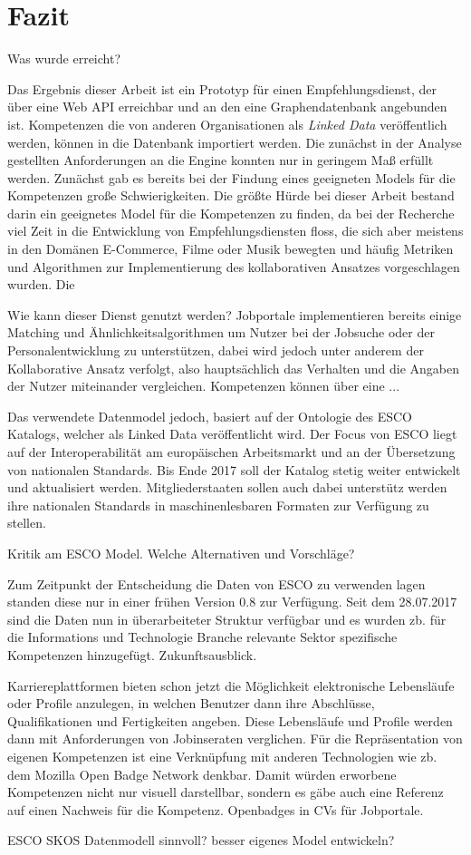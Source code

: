 \section{Fazit}\label{fazit}

Was wurde erreicht?

Das Ergebnis dieser Arbeit ist ein Prototyp für einen Empfehlungsdienst, der über eine Web API erreichbar und an den eine Graphendatenbank angebunden ist. Kompetenzen die von anderen Organisationen als \textit{Linked Data} veröffentlich werden, können in die Datenbank importiert werden. Die zunächst in der Analyse gestellten Anforderungen an die Engine konnten nur in geringem Maß erfüllt werden. Zunächst gab es bereits bei der Findung eines geeigneten Models für die Kompetenzen große Schwierigkeiten. Die größte Hürde bei dieser Arbeit bestand darin ein geeignetes Model für die Kompetenzen zu finden, da bei der Recherche viel Zeit in die Entwicklung von Empfehlungsdiensten floss, die sich aber meistens in den Domänen E-Commerce, Filme oder Musik bewegten und häufig Metriken und Algorithmen zur Implementierung des kollaborativen Ansatzes vorgeschlagen wurden. 
Die 

Wie kann dieser Dienst genutzt werden? 
Jobportale implementieren bereits einige Matching und Ähnlichkeitsalgorithmen um Nutzer bei der Jobsuche oder der Personalentwicklung zu unterstützen, dabei wird jedoch unter anderem der Kollaborative Ansatz verfolgt, also hauptsächlich das Verhalten und die Angaben der Nutzer miteinander vergleichen. Kompetenzen können über eine ...

Das verwendete Datenmodel jedoch, basiert auf der Ontologie des ESCO Katalogs, welcher als Linked Data veröffentlicht wird. Der Focus von ESCO liegt auf der Interoperabilität am europäischen Arbeitsmarkt und an der Übersetzung von nationalen Standards. Bis Ende 2017 soll der Katalog stetig weiter entwickelt und aktualisiert werden. Mitgliederstaaten sollen auch dabei unterstütz werden ihre nationalen Standards in maschinenlesbaren Formaten zur Verfügung zu stellen.

Kritik 
  am ESCO Model. Welche Alternativen und Vorschläge?
  
  Zum Zeitpunkt der Entscheidung die Daten von ESCO zu verwenden lagen standen diese nur in einer frühen Version 0.8 zur Verfügung. Seit dem 28.07.2017 sind die Daten nun in überarbeiteter Struktur verfügbar und es wurden zb. für die Informations und Technologie Branche relevante Sektor spezifische Kompetenzen hinzugefügt. 
Zukunftsausblick.

Karriereplattformen bieten schon jetzt die Möglichkeit elektronische Lebensläufe oder Profile anzulegen, in welchen Benutzer dann ihre Abschlüsse, Qualifikationen und Fertigkeiten angeben. Diese Lebensläufe und Profile werden dann mit Anforderungen von Jobinseraten verglichen. Für die Repräsentation von eigenen Kompetenzen ist eine Verknüpfung mit anderen Technologien wie zb. dem Mozilla Open Badge Network denkbar. Damit würden erworbene Kompetenzen nicht nur visuell darstellbar, sondern es gäbe auch eine Referenz auf einen Nachweis für die Kompetenz. 
Openbadges in CVs für Jobportale.

ESCO SKOS Datenmodell sinnvoll? besser eigenes Model entwickeln?